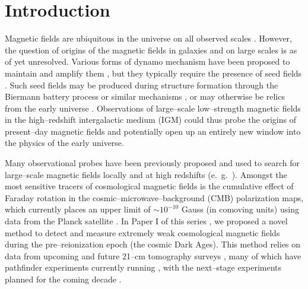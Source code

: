 \section{Introduction}
\label{sec:intro}

Magnetic fields are ubiquitous in the universe on all observed scales \cite{2013A&ARv..21...62D,Vallee04,Neronov10,2005LNP...664...89W,2012SSRv..166..215B,2016ApJ...818L..10T}. However, the question of origins of the magnetic fields in galaxies and on large scales is as of yet unresolved. Various forms of dynamo mechanism have been proposed to maintain and amplify them \cite{2013PhRvE..87e3110P}, but they typically require the presence of seed fields \cite{2013A&ARv..21...62D}. Such seed fields may be produced during structure formation through the Biermann battery process or similar mechanisms \cite{Naoz13,2013PhRvL.111e1303N}, or may otherwise be relics from the early universe \cite{2013A&ARv..21...62D,2012SSRv..166...37W,2014JCAP...05..040K}. Observations of large--scale low--strength magnetic fields in the high--redshift intergalactic medium (IGM) could thus probe the origins of present--day magnetic fields and potentially open up an entirely new window into the physics of the early universe.

Many observational probes have been previously proposed and used to search for large--scale magnetic fields locally and at high redshifts (e.~g.~\cite{Yamazaki10,Blasi99,Tavecchio10,Dolag11,2005LNP...664...89W,2014JCAP...01..009K,2013ApJ...770...47K,2014PhRvD..89j3522S,2006MNRAS.372.1060T,2009ApJ...692..236S}). Amongst the most sensitive tracers of cosmological magnetic fields is the cumulative effect of Faraday rotation in the cosmic--microwave--background (CMB) polarization maps, which currently places an upper limit of $\sim$$10^{-10}$ Gauss (in comoving units) using data from the Planck satellite \cite{2015arXiv150201594P}. In Paper I of this series \cite{2014arXiv1410.2250V}, we proposed a novel method to detect and measure extremely weak cosmological magnetic fields during the pre--reionization epoch (the cosmic Dark Ages). This method relies on data from upcoming and future 21--cm tomography surveys \cite{1997ApJ...475..429M,2004PhRvL..92u1301L}, many of which have pathfinder experiments currently running \cite{2012arXiv1201.1700G,2011AAS...21813206B,2014ApJ...788..106P,2008arXiv0802.1727C,Vanderlinde14,2015AAS...22532803D}, with the next--stage experiments planned for the coming decade \cite{2008arXiv0802.1727C,2015AAS...22532803D}. 

